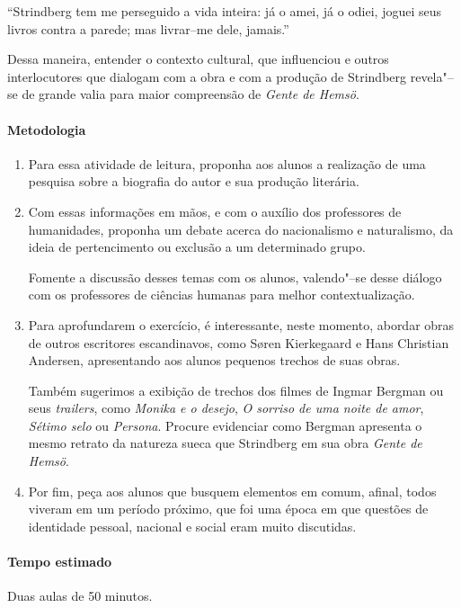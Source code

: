 \documentclass[12pt]{extarticle}
\begin{document}
``Strindberg tem me perseguido a vida inteira: já o
amei, já o odiei, joguei seus livros contra a
parede; mas livrar--me dele, jamais.''

Dessa maneira, entender o contexto cultural, que influenciou  e outros 
interlocutores que dialogam com a obra e com a produção de Strindberg 
revela"--se de grande valia para maior compreensão de \emph{Gente de Hemsö}.

\paragraph{Metodologia}

\begin{enumerate}

\item
Para essa atividade de leitura, proponha aos alunos a realização de uma 
pesquisa sobre a biografia do autor e sua produção literária. 

\item
Com essas informações em mãos, e com o auxílio dos professores de
humanidades, proponha um debate acerca do nacionalismo e naturalismo, da 
ideia de pertencimento ou exclusão a um determinado grupo.

Fomente a discussão desses temas com os
alunos, valendo"--se desse diálogo com os professores de ciências humanas 
para melhor contextualização. 

\item
Para aprofundarem o exercício, é interessante, neste momento, abordar 
obras de outros escritores escandinavos, como Søren Kierkegaard e Hans 
Christian Andersen, apresentando aos alunos pequenos trechos de suas obras.

Também sugerimos a exibição de trechos dos filmes de Ingmar Bergman 
ou seus \textit{trailers}, 
como \emph{Monika e o desejo}, \emph{O sorriso de uma noite de amor}, 
\emph{Sétimo selo} ou \emph{Persona}. Procure evidenciar como Bergman 
apresenta o mesmo retrato da 
natureza sueca que Strindberg em sua obra \emph{Gente de Hemsö}. 

\item
Por fim, peça aos alunos que busquem elementos em comum, afinal, todos 
viveram em um período próximo, que foi uma época em que questões de 
identidade pessoal, nacional e social eram muito discutidas.

\end{enumerate}

\paragraph{Tempo estimado} Duas aulas de 50 minutos.
\end{document}
